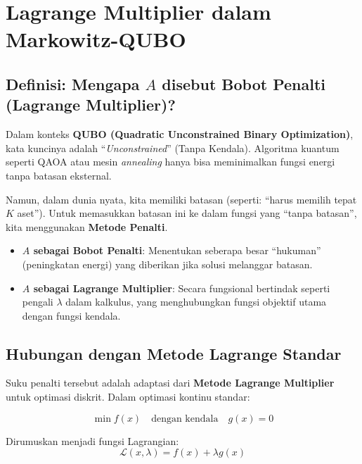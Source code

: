 \section{Lagrange Multiplier dalam Markowitz-QUBO}\label{appendix-c}

\hypertarget{definisi-mengapa-a-disebut-bobot-penalti-lagrange-multiplier}{%
\subsection{\texorpdfstring{Definisi: Mengapa \(A\) disebut Bobot Penalti (Lagrange Multiplier)?}{Definisi: Mengapa A disebut Bobot Penalti (Lagrange Multiplier)?}}\label{definisi-mengapa-a-disebut-bobot-penalti-lagrange-multiplier}}

Dalam konteks \textbf{QUBO (Quadratic Unconstrained Binary Optimization)}, kata kuncinya adalah ``\emph{Unconstrained}'' (Tanpa Kendala). Algoritma kuantum seperti QAOA atau mesin \emph{annealing} hanya bisa meminimalkan fungsi energi tanpa batasan eksternal.

Namun, dalam dunia nyata, kita memiliki batasan (seperti: ``harus memilih tepat \(K\) aset''). Untuk memasukkan batasan ini ke dalam fungsi yang ``tanpa batasan'', kita menggunakan \textbf{Metode Penalti}.

\begin{itemize}
\tightlist
\item
  \textbf{\(A\) sebagai Bobot Penalti}: Menentukan seberapa besar ``hukuman'' (peningkatan energi) yang diberikan jika solusi melanggar batasan.
\item
  \textbf{\(A\) sebagai Lagrange Multiplier}: Secara fungsional bertindak seperti pengali \(\lambda\) dalam kalkulus, yang menghubungkan fungsi objektif utama dengan fungsi kendala.
\end{itemize}

\hypertarget{hubungan-dengan-metode-lagrange-standar}{%
\subsection{Hubungan dengan Metode Lagrange Standar}\label{hubungan-dengan-metode-lagrange-standar}}

Suku penalti tersebut adalah adaptasi dari \textbf{Metode Lagrange Multiplier} untuk optimasi diskrit. Dalam optimasi kontinu standar:

\[\min f(x) \quad \text{dengan kendala} \quad g(x) = 0\]

Dirumuskan menjadi fungsi Lagrangian: \[\mathcal{L}(x, \lambda) = f(x) + \lambda g(x)\]

